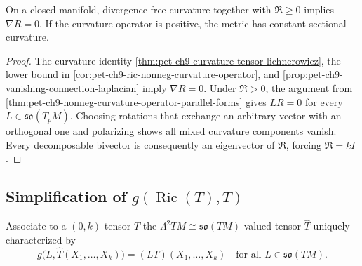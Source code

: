 \begin{theorem}
  \label{thm:pet-ch9-tachibana-parallel-curvature}

  On a closed manifold, divergence-free curvature together with
  $\mathfrak R\ge0$ implies $\nabla R=0$.  If the curvature operator is
  positive, the metric has constant sectional curvature.
\end{theorem}
\begin{proof}
  \sketch
  The curvature identity \cref{thm:pet-ch9-curvature-tensor-lichnerowicz}, the
  lower bound in \cref{cor:pet-ch9-ric-nonneg-curvature-operator}, and
  \cref{prop:pet-ch9-vanishing-connection-laplacian} imply \(\nabla R=0\).
  Under \(\mathfrak R>0\), the argument from
  \cref{thm:pet-ch9-nonneg-curvature-operator-parallel-forms} gives
  \(LR=0\) for every \(L\in\mathfrak{so}(T_pM)\).  Choosing rotations that
  exchange an arbitrary vector with an orthogonal one and polarizing shows
  all mixed curvature components vanish.  Every decomposable bivector is
  consequently an eigenvector of \(\mathfrak R\), forcing
  \(\mathfrak R=kI\).
\end{proof}

\subsection{Simplification of $g(\operatorname{Ric}(T),T)$}

\begin{definition}
  \label{def:pet-ch9-tensor-lambda2-valued}

  Associate to a $(0,k)$-tensor $T$ the
  $\Lambda^2TM\cong\mathfrak{so}(TM)$-valued tensor $\hat T$ uniquely
  characterized by
  \[
    g\big(L,\hat T(X_1,\dots,X_k)\big)=(LT)(X_1,\dots,X_k)\quad\text{for all }
    L\in\mathfrak{so}(TM).
  \]
\end{definition}


